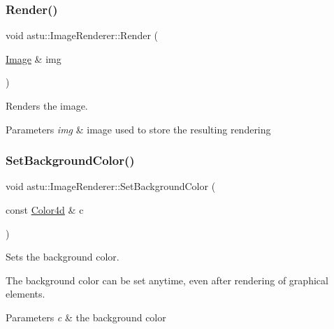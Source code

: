 \subsubsection{\texorpdfstring{Render()}{Render()}}
{\footnotesize\ttfamily void astu\+::\+Image\+Renderer\+::\+Render (\begin{DoxyParamCaption}\item[{\hyperlink{classastu_1_1Image}{Image} \&}]{img }\end{DoxyParamCaption})}

Renders the image.


\begin{DoxyParams}{Parameters}
{\em img} & image used to store the resulting rendering \\
\hline
\end{DoxyParams}
\mbox{\label{classastu_1_1ImageRenderer_a01d5e67526360be932393a0ec477147c}} 
\subsubsection{\texorpdfstring{Set\+Background\+Color()}{SetBackgroundColor()}}
{\footnotesize\ttfamily void astu\+::\+Image\+Renderer\+::\+Set\+Background\+Color (\begin{DoxyParamCaption}\item[{const \hyperlink{classastu_1_1Color}{Color4d} \&}]{c }\end{DoxyParamCaption})\hspace{0.3cm}{\ttfamily [noexcept]}}

Sets the background color.

The background color can be set anytime, even after rendering of graphical elements.


\begin{DoxyParams}{Parameters}
{\em c} & the background color \\
\hline
\end{DoxyParams}
\mbox{\label{classastu_1_1ImageRenderer_ae2de9a19765358aaf0ce3b0086afe593}} 
